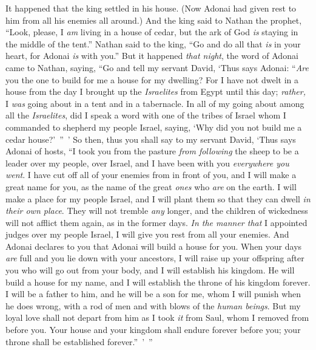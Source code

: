 \begin{biblechapter} %
 It happened that the king settled in his house. (Now Adonai had given rest to him from all his enemies all around.)
\verse And the king said to Nathan the prophet, “Look, please, I \textit{am} living in a house of cedar, but the ark of God \textit{is} staying in the middle of the tent.”
\verse Nathan said to the king, “Go and do all that \textit{is} in your heart, for Adonai \textit{is} with you.”
\verse But it happened \textit{that night}, the word of Adonai came to Nathan, saying,
\verse “Go and tell my servant David, ‘Thus says Adonai: “\textit{Are} you the one to build for me a house for my dwelling?
\verse For I have not dwelt in a house from the day I brought up the \textit{Israelites} from Egypt until this day; \textit{rather,} I \textit{was} going about in a tent and in a tabernacle.
\verse In all of my going about among all the \textit{Israelites}, did I speak a word with one of the tribes of Israel whom I commanded to shepherd my people Israel, saying, ‘Why did you not build me a cedar house?’ ” ’
\verse So then, thus you shall say to my servant David, ‘Thus says Adonai of hosts, “I took you from the pasture \textit{from following} the sheep to be a leader over my people, over Israel,
\verse and I have been with you \textit{everywhere you went}. I have cut off all of your enemies from in front of you, and I will make a great name for you, as the name of the great \textit{ones} who \textit{are} on the earth.
\verse I will make a place for my people Israel, and I will plant them so that they can dwell \textit{in their own place}. They will not tremble \textit{any} longer, and the children of wickedness will not afflict them again, as in the former days.
\verse \textit{In the manner that} I appointed judges over my people Israel, I will give you rest from all your enemies. And Adonai declares to you that Adonai will build a house for you.
\verse When your days \textit{are} full and you lie down with your ancestors, I will raise up your offspring after you who will go out from your body, and I will establish his kingdom.
\verse He will build a house for my name, and I will establish the throne of his kingdom forever.
\verse I will be a father to him, and he will be a son for me, whom I will punish when he does wrong, with a rod of men and with blows of the \textit{human beings}.
\verse But my loyal love shall not depart from him as I took \textit{it} from Saul, whom I removed from before you.
\verse Your house and your kingdom shall endure forever before you; your throne shall be established forever.” ’ ”

\end{biblechapter}
